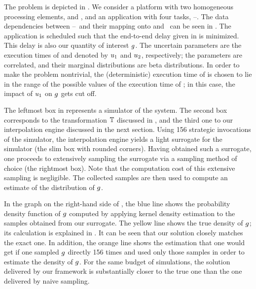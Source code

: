 \newcommand{\cores}{\token{PE1} and \token{PE2}}
\newcommand{\tasks}{\token{T1}--\token{T4}}
The problem is depicted in . We consider a platform with two
homogeneous processing elements, \cores, and an application with four tasks,
\tasks. The data dependencies between \tasks\ and their mapping onto \cores\ can
be seen in . The application is scheduled such that the end-to-end
delay given in  is minimized. This delay is also our
quantity of interest $g$. The uncertain parameters are the execution times of
 and  denoted by $u_1$ and $u_2$, respectively; the
parameters are correlated, and their marginal distributions are beta
distributions. In order to make the problem nontrivial, the (deterministic)
execution time of  is chosen to lie in the range of the possible
values of the execution time of ; in this case, the impact of $u_1$
on $g$ gets cut off.

The leftmost box in  represents a simulator of the system. The
second box corresponds to the transformation $\mathbb{T}$ discussed in
, and the third one to our interpolation engine discussed in
the next section. Using 156 strategic invocations of the simulator, the
interpolation engine yields a light surrogate for the simulator (the slim box
with rounded corners). Having obtained such a surrogate, one proceeds to
extensively sampling the surrogate via a sampling method of choice (the
rightmost box). Note that the computation cost of this extensive sampling is
negligible. The collected samples are then used to compute an estimate of the
distribution of $g$.

In the graph on the right-hand side of , the blue line shows the
probability density function of $g$ computed by applying kernel density
estimation to the samples obtained from our surrogate. The yellow line shows the
true density of $g$; its calculation is explained in . It
can be seen that our solution closely matches the exact one. In addition, the
orange line shows the estimation that one would get if one sampled $g$ directly
156 times and used only those samples in order to estimate the density of $g$.
For the same budget of simulations, the solution delivered by our framework is
substantially closer to the true one than the one delivered by naive sampling.
